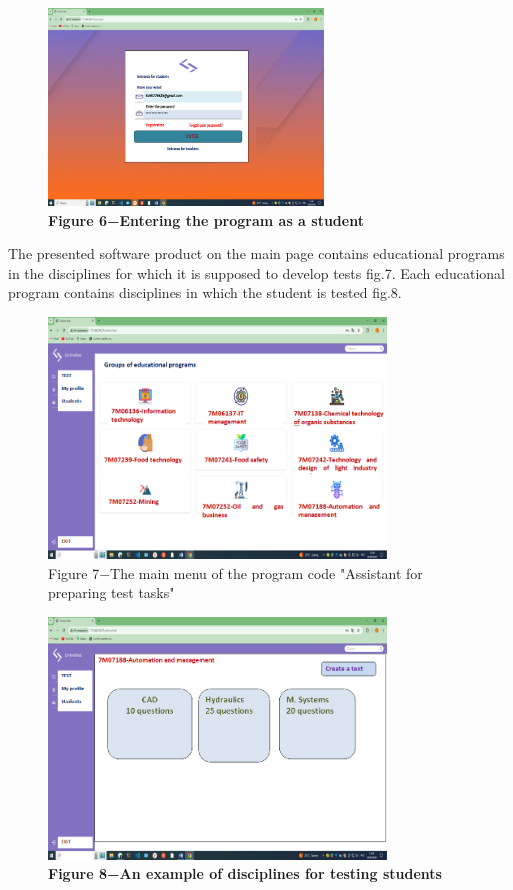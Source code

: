 \begin{figure}[H]
	\centering
	\includegraphics[height=0.35\textwidth, width=0.65\textwidth]{assets/131}
	\caption*{\bfseries Figure 6−Entering the program as a student}
\end{figure}

\begin{multicols}{2}
The presented software product on the main page contains educational
programs in the disciplines for which it is supposed to develop tests fig.7.
Each educational program contains disciplines in which the student is tested fig.8.
\end{multicols}



\begin{figure}[H]
	\centering
	\includegraphics[height=0.4\textwidth, width=0.8\textwidth]{assets/132}
	\caption*{Figure 7−The main menu of the program code "Assistant for
	preparing test tasks"}
\end{figure}



\begin{figure}[H]
	\centering
	\includegraphics[height=0.4\textwidth, width=0.8\textwidth]{assets/133}
	\caption*{\bfseries Figure 8−An example of disciplines for testing students}
\end{figure}

